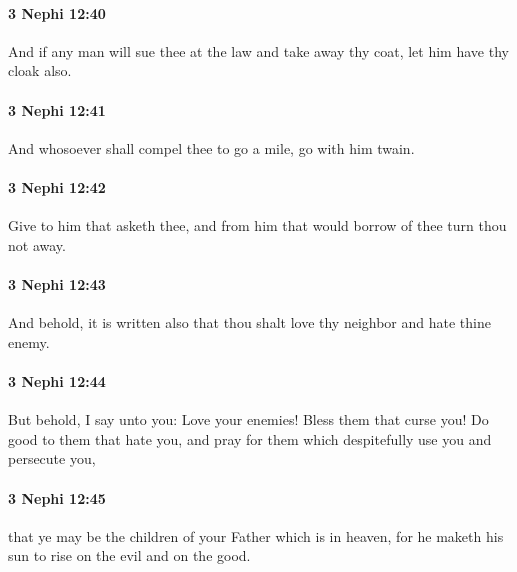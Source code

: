 		\paragraph{3 Nephi 12:40} %
			\label{3NEPHI-12-40}

			And if any man will sue thee at the law and take away thy coat,
			let him have thy cloak also.

		\paragraph{3 Nephi 12:41} %
			\label{3NEPHI-12-41}

			And whosoever shall compel thee to go a mile,
			go with him twain.

		\paragraph{3 Nephi 12:42} %
			\label{3NEPHI-12-42}

			Give to him that asketh thee,
			and from him that would borrow of thee turn thou not away.

		\paragraph{3 Nephi 12:43} %
			\label{3NEPHI-12-43}

			And behold, it is written also
			that thou shalt love thy neighbor and hate thine enemy.

		\paragraph{3 Nephi 12:44} %
			\label{3NEPHI-12-44}

			But behold, I say unto you:
			Love your enemies!
			Bless them that curse you!
			Do good to them that hate you,
			and pray for them which despitefully use you and persecute you,

		\paragraph{3 Nephi 12:45} %
			\label{3NEPHI-12-45}

			that ye may be the children of your Father which is in heaven,
			for he maketh his sun to rise on the evil and on the good.

